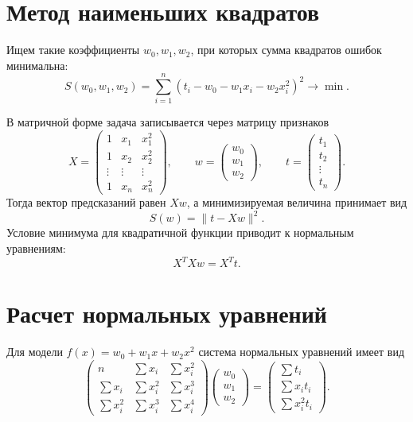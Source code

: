 \documentclass[12pt,a4paper]{article}
\begin{document}
\section*{Метод наименьших квадратов}
Ищем такие коэффициенты $w_0,w_1,w_2$, при которых сумма квадратов ошибок
минимальна:
\[
    S(w_0,w_1,w_2)
    =
    \sum_{i=1}^{n}\left(t_i-w_0-w_1x_i-w_2x_i^2\right)^2
    \longrightarrow \min.
\]

В матричной форме задача записывается через матрицу признаков
\[
    X=
    \begin{pmatrix}
        1 & x_1 & x_1^2\\
        1 & x_2 & x_2^2\\
        \vdots & \vdots & \vdots\\
        1 & x_n & x_n^2
    \end{pmatrix},
    \qquad
    w=
    \begin{pmatrix}
        w_0\\
        w_1\\
        w_2
    \end{pmatrix},
    \qquad
    t=
    \begin{pmatrix}
        t_1\\
        t_2\\
        \vdots\\
        t_n
    \end{pmatrix}.
\]
Тогда вектор предсказаний равен $Xw$, а минимизируемая величина принимает вид
\[
    S(w)=\|t-Xw\|^2.
\]
Условие минимума для квадратичной функции приводит к нормальным уравнениям:
\[
    X^TXw=X^Tt.
\]

\section*{Расчет нормальных уравнений}
Для модели $f(x)=w_0+w_1x+w_2x^2$ система нормальных уравнений имеет вид
\[
\begin{pmatrix}
n & \sum x_i & \sum x_i^2\\
\sum x_i & \sum x_i^2 & \sum x_i^3\\
\sum x_i^2 & \sum x_i^3 & \sum x_i^4
\end{pmatrix}
\begin{pmatrix}
w_0\\
w_1\\
w_2
\end{pmatrix}
=
\begin{pmatrix}
\sum t_i\\
\sum x_it_i\\
\sum x_i^2t_i
\end{pmatrix}.
\]
\end{document}
